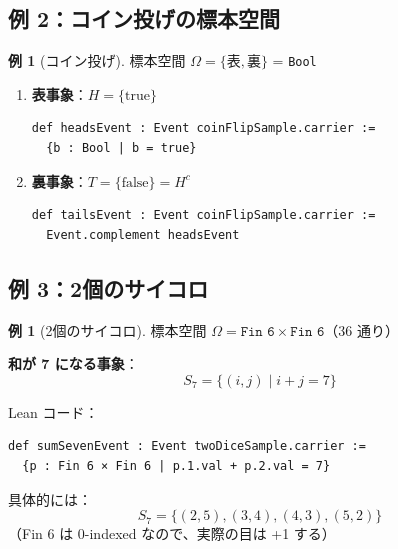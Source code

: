 \documentclass[12pt,a4paper,ja=standard]{bxjsarticle}
\theoremstyle{definition}
\newtheorem{example}[definition]{例}
\begin{document}
\subsection{例 2：コイン投げの標本空間}

\begin{example}[コイン投げ]
標本空間 $\Omega = \{\text{表}, \text{裏}\}$ = \texttt{Bool}

\begin{enumerate}
    \item \textbf{表事象}：$H = \{\text{true}\}$
    \begin{verbatim}
def headsEvent : Event coinFlipSample.carrier :=
  {b : Bool | b = true}
    \end{verbatim}
    
    \item \textbf{裏事象}：$T = \{\text{false}\} = H^c$
    \begin{verbatim}
def tailsEvent : Event coinFlipSample.carrier :=
  Event.complement headsEvent
    \end{verbatim}
\end{enumerate}
\end{example}

\subsection{例 3：2個のサイコロ}

\begin{example}[2個のサイコロ]
標本空間 $\Omega = \texttt{Fin 6} \times \texttt{Fin 6}$（36 通り）

\textbf{和が 7 になる事象}：
\[
S_7 = \{(i, j) \mid i + j = 7\}
\]

Lean コード：
\begin{verbatim}
def sumSevenEvent : Event twoDiceSample.carrier :=
  {p : Fin 6 × Fin 6 | p.1.val + p.2.val = 7}
\end{verbatim}

具体的には：
\[
S_7 = \{(2,5), (3,4), (4,3), (5,2)\}
\]
（Fin 6 は 0-indexed なので、実際の目は +1 する）
\end{example}

\begin{center}
\end{center}
\end{document}
